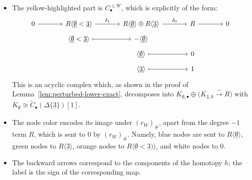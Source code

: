 \documentclass[a4paper,leqno]{amsart}
\begin{document}
\begin{eg}
\begin{itemize}
 \item The yellow-highlighted part is $C_\bullet^{\le \underline{W}}$, which is explicitly of the form:
\[
\begin{tikzcd}[row sep=tiny, column sep=large]
  0 \arrow[r] & R\langle\underline{\emptyset}<\underline{3}\rangle \arrow[r, "\delta_1"] & R\langle\underline{\emptyset}\rangle\oplus R\langle\underline{3}\rangle \arrow[r, "\delta_0"] & R \arrow[r] & 0 \\
  & \langle\underline{\emptyset}<\underline{3}\rangle \arrow[r, mapsto] & -\langle\underline{\emptyset}\rangle & & \\
  & & \langle\underline{\emptyset}\rangle \arrow[r, mapsto] & 0 & \\
  & & \langle\underline{3}\rangle \arrow[r, mapsto] & 1 &
\end{tikzcd}
\]
This is an acyclic complex which, as shown in the proof of Lemma~\ref{lem:perturbed-lower-exact}, decomposes into $K_{\underline{\emptyset},\bullet}\oplus\bigl(K_{\underline{3},0}\xrightarrow{\sim}R\bigr)$ with $K_{\underline{\emptyset}} \cong \widetilde{C}_\bullet(\Delta\{\underline{3}\})[1]$.

  \item The node color encodes its image under $(r_W)_\#$, apart from the degree $-1$ term $R$, which is sent to $0$ by $(r_W)_\#$.  Namely, blue nodes are sent to $R\langle \underline{\emptyset}\rangle$, green nodes to $R\langle \underline{3}\rangle$, orange nodes to $R\langle \underline{\emptyset}< \underline{3})\rangle$, and white nodes to $0$.

  \item The backward arrows correspond to the components of the homotopy $h$; the label is the sign of the corresponding map.
\end{itemize}
\end{eg}
\end{document}
